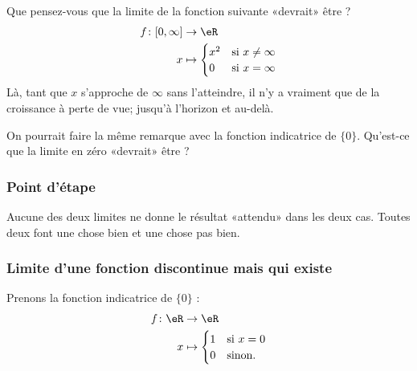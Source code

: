 Que pensez-vous que la limite de la fonction suivante «devrait» être ?
\begin{equation}
    \begin{aligned}
        f\colon \mathopen[ 0 , \infty \mathclose]&\to \eR \\
        x&\mapsto \begin{cases}
            x^2    &   \text{si } x\neq \infty\\
            0    &    \text{si }x=\infty
        \end{cases}
    \end{aligned}
\end{equation}
Là, tant que \( x\) s'approche de \( \infty\) sans l'atteindre, il n'y a vraiment que de la croissance à perte de vue; jusqu'à l'horizon et au-delà.

On pourrait faire la même remarque avec la fonction indicatrice de \( \{ 0 \}\). Qu'est-ce que la limite en zéro «devrait» être ?

\subsubsection{Point d'étape}

Aucune des deux limites ne donne le résultat «attendu» dans les deux cas. Toutes deux font une chose bien et une chose pas bien.

\subsubsection{Limite d'une fonction discontinue mais qui existe}

Prenons la fonction indicatrice de \( \{ 0 \}\) :
\begin{equation}
    \begin{aligned}
        f\colon\eR &\to \eR \\
        x&\mapsto \begin{cases}
            1    &   \text{si } x=0\\
            0    &    \text{sinon. }
        \end{cases}
    \end{aligned}
\end{equation}

